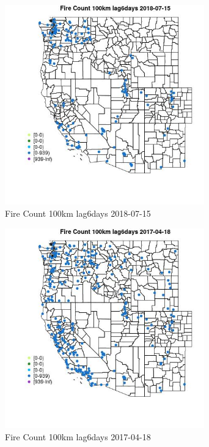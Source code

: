 \begin{figure} 
\centering  
\includegraphics[width=0.77\textwidth]{Code_Outputs/Report_ML_input_PM25_Step4_part_e_de_duplicated_aves_compiled_2019-05-21wNAs_MapObsFire_Count_100km_lag6days2018-07-15.jpg} 
\caption{\label{fig:Report_ML_input_PM25_Step4_part_e_de_duplicated_aves_compiled_2019-05-21wNAsMapObsFire_Count_100km_lag6days2018-07-15}Fire Count 100km lag6days 2018-07-15} 
\end{figure} 
 

\begin{figure} 
\centering  
\includegraphics[width=0.77\textwidth]{Code_Outputs/Report_ML_input_PM25_Step4_part_e_de_duplicated_aves_compiled_2019-05-21wNAs_MapObsFire_Count_100km_lag6days2017-04-18.jpg} 
\caption{\label{fig:Report_ML_input_PM25_Step4_part_e_de_duplicated_aves_compiled_2019-05-21wNAsMapObsFire_Count_100km_lag6days2017-04-18}Fire Count 100km lag6days 2017-04-18} 
\end{figure} 
 

